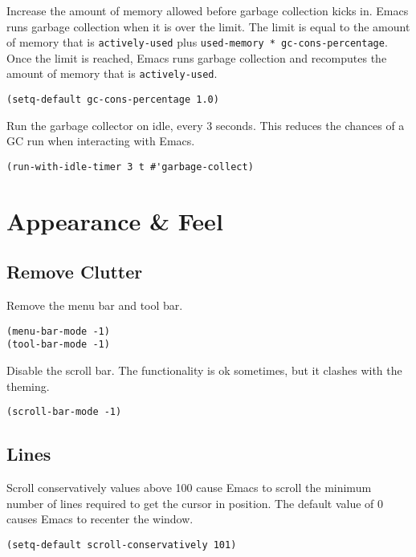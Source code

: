 \documentclass[11pt]{article}
\begin{document}
Increase the amount of memory allowed before garbage collection kicks in. Emacs
runs garbage collection when it is over the limit. The limit is equal to the
amount of memory that is \texttt{actively-used} plus \texttt{used-memory *
gc-cons-percentage}. Once the limit is reached, Emacs runs garbage collection
and recomputes the amount of memory that is \texttt{actively-used}.

\begin{verbatim}
(setq-default gc-cons-percentage 1.0)
\end{verbatim}

Run the garbage collector on idle, every 3 seconds. This reduces the chances of
a GC run when interacting with Emacs.

\begin{verbatim}
(run-with-idle-timer 3 t #'garbage-collect)
\end{verbatim}
\section{Appearance \& Feel}
\label{sec:org2e01e3f}

\subsection{Remove Clutter}
\label{sec:orgd7be8ef}

Remove the menu bar and tool bar.

\begin{verbatim}
(menu-bar-mode -1)
(tool-bar-mode -1)
\end{verbatim}

Disable the scroll bar. The functionality is ok sometimes, but it clashes with
the theming.

\begin{verbatim}
(scroll-bar-mode -1)
\end{verbatim}
\subsection{Lines}
\label{sec:orgec02fd1}

Scroll conservatively values above 100 cause Emacs to scroll the
minimum number of lines required to get the cursor in position. The
default value of 0 causes Emacs to recenter the window.

\begin{verbatim}
(setq-default scroll-conservatively 101)
\end{verbatim}
\end{document}

